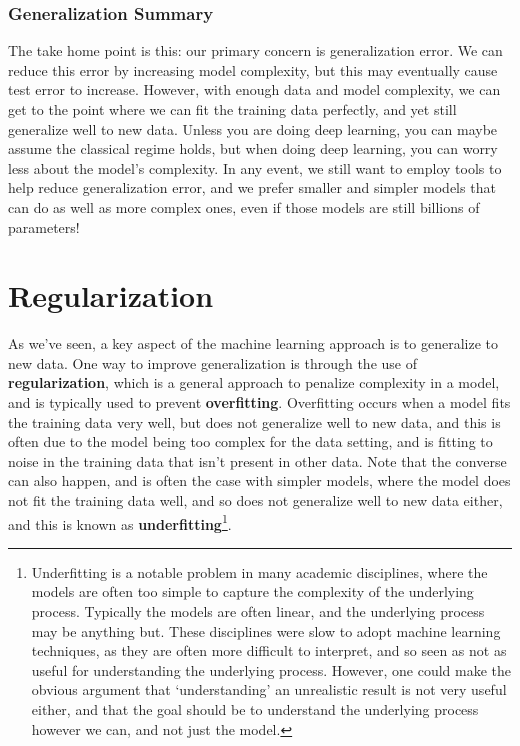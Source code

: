 \documentclass[
  letterpaper,
]{krantz}
\begin{document}
\subsubsection{Generalization Summary}\label{generalization-summary}

The take home point is this: our primary concern is generalization
error. We can reduce this error by increasing model complexity, but this
may eventually cause test error to increase. However, with enough data
and model complexity, we can get to the point where we can fit the
training data perfectly, and yet still generalize well to new data.
Unless you are doing deep learning, you can maybe assume the classical
regime holds, but when doing deep learning, you can worry less about the
model's complexity. In any event, we still want to employ tools to help
reduce generalization error, and we prefer smaller and simpler models
that can do as well as more complex ones, even if those models are still
billions of parameters!

\section{Regularization}\label{sec-ml-regularization}

As we've seen, a key aspect of the machine learning approach is to
generalize to new data. One way to improve generalization is through the
use of \textbf{regularization}, which is a general approach to penalize
complexity in a model, and is typically used to prevent
\textbf{overfitting}. Overfitting occurs when a model fits the training
data very well, but does not generalize well to new data, and this is
often due to the model being too complex for the data setting, and is
fitting to noise in the training data that isn't present in other data.
Note that the converse can also happen, and is often the case with
simpler models, where the model does not fit the training data well, and
so does not generalize well to new data either, and this is known as
\textbf{underfitting}\footnote{Underfitting is a notable problem in many
  academic disciplines, where the models are often too simple to capture
  the complexity of the underlying process. Typically the models are
  often linear, and the underlying process may be anything but. These
  disciplines were slow to adopt machine learning techniques, as they
  are often more difficult to interpret, and so seen as not as useful
  for understanding the underlying process. However, one could make the
  obvious argument that `understanding' an unrealistic result is not
  very useful either, and that the goal should be to understand the
  underlying process however we can, and not just the model.}.
\end{document}
